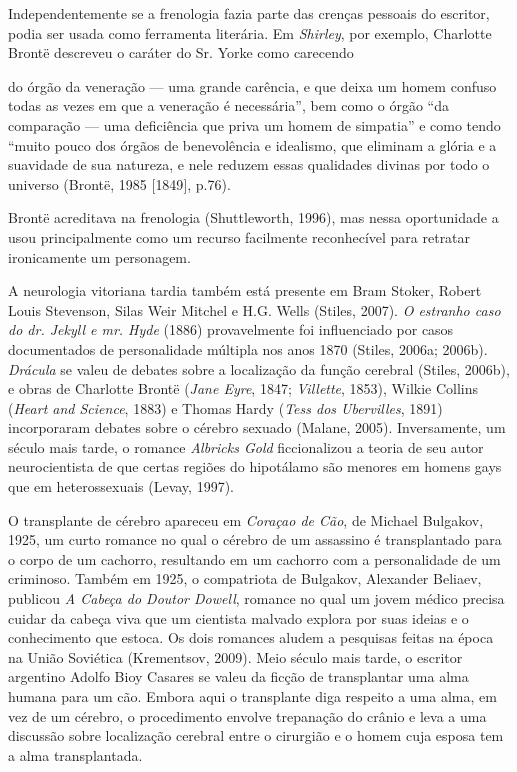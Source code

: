 Independentemente se a frenologia fazia parte das crenças pessoais do
escritor, podia ser usada como ferramenta literária. Em \emph{Shirley},
por exemplo, Charlotte Brontë descreveu o caráter do Sr. Yorke como
carecendo

do órgão da veneração --- uma grande carência, e que deixa um homem
confuso todas as vezes em que a veneração é necessária'', bem como o
órgão ``da comparação --- uma deficiência que priva um homem de
simpatia'' e como tendo ``muito pouco dos órgãos de benevolência e
idealismo, que eliminam a glória e a suavidade de sua natureza, e nele
reduzem essas qualidades divinas por todo o universo (Brontë, 1985
{[}1849{]}, p.76).

Brontë acreditava na frenologia (Shuttleworth, 1996), mas nessa
oportunidade a usou principalmente como um recurso facilmente
reconhecível para retratar ironicamente um personagem.

A neurologia vitoriana tardia também está presente em Bram Stoker,
Robert Louis Stevenson, Silas Weir Mitchel e H.G. Wells (Stiles, 2007).
\emph{O estranho caso do dr. Jekyll e mr. Hyde} (1886) provavelmente foi
influenciado por casos documentados de personalidade múltipla nos anos
1870 (Stiles, 2006a; 2006b). \emph{Drácula} se valeu de debates sobre a
localização da função cerebral (Stiles, 2006b), e obras de Charlotte
Brontë (\emph{Jane Eyre}, 1847; \emph{Villette}, 1853), Wilkie Collins
(\emph{Heart and Science}, 1883) e Thomas Hardy (\emph{Tess dos
Ubervilles}, 1891) incorporaram debates sobre o cérebro sexuado (Malane,
2005). Inversamente, um século mais tarde, o romance \emph{Albricks
Gold} ficcionalizou a teoria de seu autor neurocientista de que certas
regiões do hipotálamo são menores em homens gays que em heterossexuais
(Levay, 1997).

O transplante de cérebro apareceu em \emph{Coraçao de Cão}, de Michael
Bulgakov, 1925, um curto romance no qual o cérebro de um assassino é
transplantado para o corpo de um cachorro, resultando em um cachorro com
a personalidade de um criminoso. Também em 1925, o compatriota de
Bulgakov, Alexander Beliaev, publicou \emph{A Cabeça do Doutor Dowell},
romance no qual um jovem médico precisa cuidar da cabeça viva que um
cientista malvado explora por suas ideias e o conhecimento que estoca.
Os dois romances aludem a pesquisas feitas na época na União Soviética
(Krementsov, 2009). Meio século mais tarde, o escritor argentino Adolfo
Bioy Casares se valeu da ficção de transplantar uma alma humana para um
cão. Embora aqui o transplante diga respeito a uma alma, em vez de um
cérebro, o procedimento envolve trepanação do crânio e leva a uma
discussão sobre localização cerebral entre o cirurgião e o homem cuja
esposa tem a alma transplantada.

